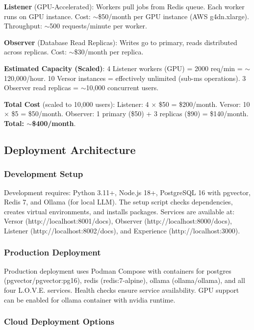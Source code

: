 \documentclass[10pt,twocolumn]{article}
\begin{document}
\textbf{Listener} (GPU-Accelerated): Workers pull jobs from Redis queue. Each worker runs on GPU instance. Cost: $\sim$\$50/month per GPU instance (AWS g4dn.xlarge). Throughput: $\sim$500 requests/minute per worker.

\textbf{Observer} (Database Read Replicas): Writes go to primary, reads distributed across replicas. Cost: $\sim$\$30/month per replica.

\textbf{Estimated Capacity (Scaled)}: 4 Listener workers (GPU) = 2000 req/min = $\sim$120,000/hour. 10 Versor instances = effectively unlimited (sub-ms operations). 3 Observer read replicas = $\sim$10,000 concurrent users.

\textbf{Total Cost} (scaled to 10,000 users): Listener: 4 $\times$ \$50 = \$200/month. Versor: 10 $\times$ \$5 = \$50/month. Observer: 1 primary (\$50) + 3 replicas (\$90) = \$140/month. \textbf{Total: $\sim$\$400/month}.

\subsection{Deployment Architecture}

\subsubsection{Development Setup}

Development requires: Python 3.11+, Node.js 18+, PostgreSQL 16 with pgvector, Redis 7, and Ollama (for local LLM). The setup script checks dependencies, creates virtual environments, and installs packages. Services are available at: Versor (http://localhost:8001/docs), Observer (http://localhost:8000/docs), Listener (http://localhost:8002/docs), and Experience (http://localhost:3000).

\subsubsection{Production Deployment}

Production deployment uses Podman Compose with containers for postgres (pgvector/pgvector:pg16), redis (redis:7-alpine), ollama (ollama/ollama), and all four L.O.V.E. services. Health checks ensure service availability. GPU support can be enabled for ollama container with nvidia runtime.

\subsubsection{Cloud Deployment Options}
\end{document}
